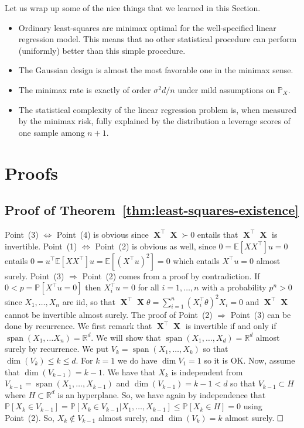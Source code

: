 \documentclass[
	fontsize=11pt, %
	twoside=false, %
	numbers=noenddot, %
]{kaobook}
\DeclareMathOperator{\bX}{{\boldsymbol X}}
\DeclareMathOperator*{\spa}{span}
\renewcommand{\P}{\mathbb P}
\newcommand{\E}{\mathbb E}
\newcommand{\R}{\mathbb R}
\begin{document}
Let us wrap up some of the nice things that we learned in this Section.
\begin{itemize}
	\item Ordinary least-squares are minimax optimal for the well-specified linear regression model. This means that no other statistical procedure can perform (uniformly) better than this simple procedure.
	\item The Gaussian design is almost the most favorable one in the minimax sense.
	\item The minimax rate is exactly of order $\sigma^2 d / n$ under mild assumptions
	 on $\P_X$.
	\item The statistical complexity of the linear regression problem is, when measured by the minimax risk, fully explained by the distribution a leverage scores of one sample among $n+1$.
\end{itemize}


\section{Proofs} %
\label{sec:chap04_proofs}

\subsection{Proof of Theorem~\ref{thm:least-squares-existence}} %

Point~(3) $\Leftrightarrow$ Point~(4) is obvious since $\bX^\top \bX \succ 0$ entails that $\bX^\top \bX$ is invertible. 
Point~(1) $\Leftrightarrow$ Point~(2) is obvious as well, since $0 = \E[X X^\top] u = 0$ entails $0 = u^\top \E[X X^\top] u = \E[ (X^\top u)^2] = 0$ which entails $X^\top u = 0$ almost surely. 
Point~(3) $\Rightarrow$ Point~(2) comes from a proof by contradiction. If $0 < p = \P[X^\top u = 0]$ then $X_i^\top u = 0$ for all $i=1, \ldots, n$ with a probability $p^n > 0$ since $X_1, \ldots, X_n$ are iid, so that $\bX^\top \bX \theta = \sum_{i=1}^n (X_i^\top \theta)^2 X_i = 0$ and $\bX^\top \bX$ cannot be invertible almost surely.
The proof of Point~(2) $\Rightarrow$ Point~(3) can be done by recurrence. 
We first remark that $\bX^\top \bX$ is invertible if and only if $\spa(X_1, \ldots X_n) = \R^d$.%
\sidenote{Indeed, $\ker(\bX^\top \bX = \ker(\bX)$ so that $\bX^\top \bX u = 0 \Leftrightarrow \bX u = 0 \Leftrightarrow X_i^\top \theta = 0$ for all $i=1, \ldots, n$.}
We will show that $\spa(X_1, \ldots, X_d) = \R^d$ almost surely by recurrence. 
We put $V_k = \spa(X_1, \ldots, X_k)$ so that $\dim(V_k) \leq k \leq d$.
For $k=1$ we do have $\dim V_1 = 1$ so it is OK.
Now, assume that $\dim(V_{k-1}) = k-1$. 
We have that $X_k$ is independent from $V_{k-1} = \spa(X_1, \ldots, X_{k-1})$ and $\dim(V_{k-1}) = k-1 < d$ so that $V_{k-1} \subset H$ where $H \subset \R^d$ is an hyperplane. 
So, we have again by independence that $\P[X_k \in V_{k-1}] = \P[X_k \in V_{k-1} | X_1, \ldots, X_{k-1}] \leq \P[X_k \in H] = 0$ using Point~(2). 
So, $X_k \notin V_{k-1}$ almost surely, and $\dim(V_k) = k$ almost surely. $\hfill \square$
\end{document}
